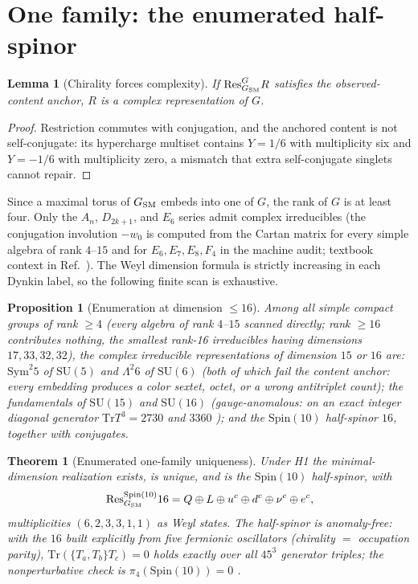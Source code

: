 \documentclass[
  aps,prd,superscriptaddress,nofootinbib,preprint
]{revtex4-2}
\newtheorem{theorem}{Theorem}
\newtheorem{lemma}{Lemma}
\newtheorem{proposition}{Proposition}
\theoremstyle{remark}
\newcommand{\Spin}{\mathrm{Spin}}
\newcommand{\SU}{\mathrm{SU}}
\newcommand{\Tr}{\mathrm{Tr}}
\newcommand{\Res}{\mathrm{Res}}
\begin{document}
\section{One family: the enumerated half-spinor}
\label{sec:sixteen}

\begin{lemma}[Chirality forces complexity]
\label{lem:complex}
If $\Res^G_{G_{\rm SM}}R$ satisfies the observed-content anchor, $R$ is
a complex representation of $G$.
\end{lemma}

\begin{proof}
Restriction commutes with conjugation, and the anchored content is not
self-conjugate: its hypercharge multiset contains $Y=1/6$ with
multiplicity six and $Y=-1/6$ with multiplicity zero, a mismatch that
extra self-conjugate singlets cannot repair.
\end{proof}

Since a maximal torus of $G_{\rm SM}$ embeds into one of $G$, the rank
of $G$ is at least four.  Only the $A_n$, $D_{2k+1}$, and $E_6$ series
admit complex irreducibles (the conjugation involution $-w_0$ is
computed from the Cartan matrix for every simple algebra of rank
$4$--$15$ and for $E_6,E_7,E_8,F_4$ in the machine audit; textbook
context in Ref.~\cite{Slansky1981}).  The Weyl dimension formula is
strictly increasing in each Dynkin label, so the following finite scan
is exhaustive.

\begin{proposition}[Enumeration at dimension $\le16$]
\label{prop:enumeration}
Among all simple compact groups of rank $\ge4$ (every algebra of rank
$4$--$15$ scanned directly; rank $\ge16$ contributes nothing, the
smallest rank-16 irreducibles having dimensions $17,33,32,32$), the
complex irreducible representations of dimension $15$ or $16$ are:
$\mathrm{Sym}^2 5$ of $\SU(5)$ and $\Lambda^2 6$ of $\SU(6)$
(both of which fail the content anchor: every embedding produces a
color sextet, octet, or a wrong antitriplet count); the fundamentals
of $\SU(15)$ and $\SU(16)$ (gauge-anomalous: on an exact integer
diagonal generator $\Tr T^3=2730$ and $3360$
\cite{GeorgiGlashow1972,Okubo1977}); and the $\Spin(10)$ half-spinor
$16$, together with conjugates.
\end{proposition}

\begin{theorem}[Enumerated one-family uniqueness]
\label{thm:sixface}
Under H1 the minimal-dimension realization exists, is unique, and is
the $\Spin(10)$ half-spinor, with
\[
  \Res^{\Spin(10)}_{G_{\rm SM}}16
  =Q\oplus L\oplus u^c\oplus d^c\oplus\nu^c\oplus e^c ,
\]
multiplicities $(6,2,3,3,1,1)$ as Weyl states.  The half-spinor is
anomaly-free: with the $16$ built explicitly from five fermionic
oscillators (chirality $=$ occupation parity),
$\Tr(\{T_a,T_b\}T_c)=0$ holds exactly over all $45^3$ generator
triples; the nonperturbative check is $\pi_4(\Spin(10))=0$
\cite{WittenSU2Anomaly1982}.
\end{theorem}
\end{document}
